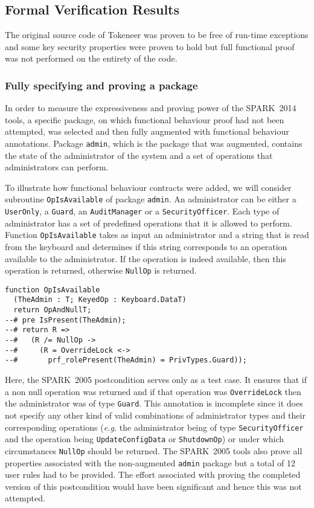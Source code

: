 \documentclass[10pt,a4paper,twocolumn]{article}
\newcommand{\oldspark}{SPARK~2005\xspace}
\newcommand{\newspark}{SPARK~2014\xspace}
\newcommand{\eg}{\textit{e.g.}\xspace}
\newcommand{\SPARK}[1]{\lstinline[language=Ada,basicstyle={\footnotesize
      \sffamily},framesep=0pt]$#1$}
\begin{document}
\subsection{Formal Verification Results}

The original source code of Tokeneer was proven to be free of run-time
exceptions and some key security properties were proven to hold but
full functional proof was not performed on the entirety of the code.

\subsubsection{Fully specifying and proving a package}

In order to measure the expressiveness and proving power of the
\newspark tools, a specific package, on which functional behaviour
proof had not been attempted, was selected and then fully augmented
with functional behaviour annotations. Package \SPARK{admin}, which is
the package that was augmented, contains the state of the
administrator of the system and a set of operations that
administrators can perform.

To illustrate how functional behaviour contracts were added, we will
consider subroutine \SPARK{OpIsAvailable} of package \SPARK{admin}. An
administrator can be either a \SPARK{UserOnly}, a \SPARK{Guard}, an
\SPARK{AuditManager} or a \SPARK{SecurityOfficer}. Each type of
administrator has a set of predefined operations that it is allowed to
perform. Function \SPARK{OpIsAvailable} takes as input an
administrator and a string that is read from the keyboard and
determines if this string corresponds to an operation available to the
administrator. If the operation is indeed available, then this
operation is returned, otherwise \SPARK{NullOp} is returned.

\begin{lstlisting}
function OpIsAvailable
  (TheAdmin : T; KeyedOp : Keyboard.DataT)
  return OpAndNullT;
--# pre IsPresent(TheAdmin);
--# return R =>
--#   (R /= NullOp ->
--#     (R = OverrideLock <->
--#       prf_rolePresent(TheAdmin) = PrivTypes.Guard));
\end{lstlisting}
Here, the \oldspark postcondition serves only as a test case. It
ensures that if a non null operation was returned and if that
operation was \SPARK{OverrideLock} then the administrator was of type
\SPARK{Guard}. This annotation is incomplete since it does not specify
any other kind of valid combinations of administrator types and their
corresponding operations (\eg the administrator being of type
\SPARK{SecurityOfficer} and the operation being
\SPARK{UpdateConfigData} or \SPARK{ShutdownOp}) or under which
circumstances \SPARK{NullOp} should be returned.
The \oldspark tools also prove all properties associated with
the non-augmented \SPARK{admin} package but a total of 12 user rules had
to be provided. The
effort associated with proving the completed version of this
postcondition would have been significant and hence this was not attempted.
\end{document}
